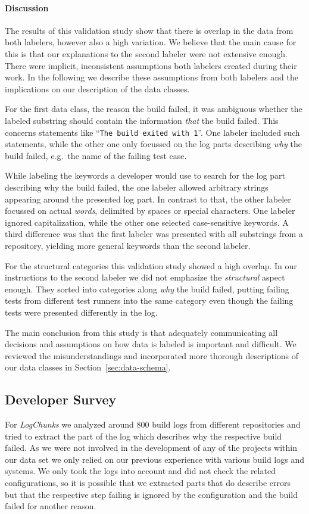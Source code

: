 \documentclass[\myrootdir/main.tex]{subfiles}
\begin{document}
\paragraph{Discussion}
The results of this validation study show that there is overlap in the data from both labelers, however also a high variation.
We believe that the main cause for this is that our explanations to the second labeler were not extensive enough.
There were implicit, inconsistent assumptions both labelers created during their work.
In the following we describe these assumptions from both labelers and the implications on our description of the data classes.

For the first data class, the reason the build failed, it was ambiguous whether the labeled substring should contain the information \emph{that} the build failed.
This concerns statements like ``\texttt{The build exited with 1}''.
One labeler included such statements, while the other one only focussed on the log parts describing \emph{why} the build failed, e.g.\ the name of the failing test case.

While labeling the keywords a developer would use to search for the log part describing why the build failed, the one labeler allowed arbitrary strings appearing around the presented log part.
In contrast to that, the other labeler focussed on actual \emph{words}, delimited by spaces or special characters.
One labeler ignored capitalization, while the other one selected case-sensitive keywords.
A third difference was that the first labeler was presented with all substrings from a repository, yielding more general keywords than the second labeler.

For the structural categories this validation study showed a high overlap.
In our instructions to the second labeler we did not emphasize the \emph{structural} aspect enough.
They sorted into categories along \emph{why} the build failed, putting failing tests from different test runners into the same category even though the failing tests were presented differently in the log.

The main conclusion from this study is that adequately communicating all decisions and assumptions on how data is labeled is important and difficult.
We reviewed the misunderstandings and incorporated more thorough descriptions of our data classes in Section~\ref{sec:data-schema}.

\subsection{Developer Survey}
For \emph{LogChunks} we analyzed around 800 build logs from different repositories and tried to extract the part of the log which describes why the respective build failed.
As we were not involved in the development of any of the projects within our data set we only relied on our previous experience with various build logs and systems.
We only took the logs into account and did not check the related configurations, so it is possible that we extracted parts that do describe errors but that the respective step failing is ignored by the configuration and the build failed for another reason.
\end{document}
